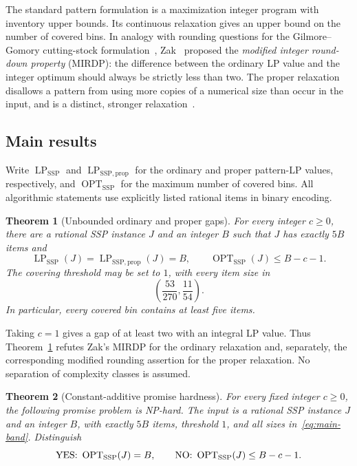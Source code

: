 \documentclass[11pt,a4paper]{article}
\newtheorem{theorem}{Theorem}
\theoremstyle{definition}
\theoremstyle{remark}
\newcommand{\SSP}{\mathrm{SSP}}
\newcommand{\OPT}{\operatorname{OPT}}
\newcommand{\LP}{\operatorname{LP}}
\begin{document}
The standard pattern formulation is a maximization integer program with inventory upper bounds. Its continuous relaxation gives an upper bound on the number of covered bins. In analogy with rounding questions for the Gilmore--Gomory cutting-stock formulation~\cite{GG61,ST95}, Zak~\cite{Zak03} proposed the \emph{modified integer round-down property} (MIRDP): the difference between the ordinary LP value and the integer optimum should always be strictly less than two. The proper relaxation disallows a pattern from using more copies of a numerical size than occur in the input, and is a distinct, stronger relaxation~\cite{MS16b}.

\subsection{Main results}
Write $\LP_{\SSP}$ and $\LP_{\SSP,\mathrm{prop}}$ for the ordinary and proper pattern-LP values, respectively, and $\OPT_{\SSP}$ for the maximum number of covered bins. All algorithmic statements use explicitly listed rational items in binary encoding.

\begin{theorem}[Unbounded ordinary and proper gaps]\label{thm:main-gap}
For every integer $c\ge0$, there are a rational SSP instance $J$ and an integer $B$ such that $J$ has exactly $5B$ items and
\begin{equation}\label{eq:main-gap}
 \LP_{\SSP}(J)=\LP_{\SSP,\mathrm{prop}}(J)=B,
 \qquad \OPT_{\SSP}(J)\le B-c-1.
\end{equation}
The covering threshold may be set to $1$, with every item size in
\begin{equation}\label{eq:main-band}
 \left(\frac{53}{270},\frac{11}{54}\right).
\end{equation}
In particular, every covered bin contains at least five items.
\end{theorem}
Taking $c=1$ gives a gap of at least two with an integral LP value. Thus Theorem~\ref{thm:main-gap} refutes Zak's MIRDP for the ordinary relaxation and, separately, the corresponding modified rounding assertion for the proper relaxation. No separation of complexity classes is assumed.

\begin{theorem}[Constant-additive promise hardness]\label{thm:main-hard}
For every fixed integer $c\ge0$, the following promise problem is NP-hard. The input is a rational SSP instance $J$ and an integer $B$, with exactly $5B$ items, threshold $1$, and all sizes in~\eqref{eq:main-band}. Distinguish
\[
 \textnormal{YES: }\OPT_{\SSP}(J)=B,
 \qquad
 \textnormal{NO: }\OPT_{\SSP}(J)\le B-c-1.
\]
\end{theorem}
\end{document}
